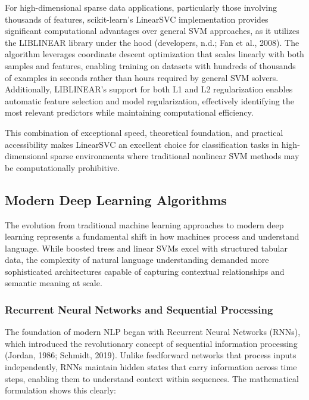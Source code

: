 \documentclass[
  titlepage]{article}
\begin{document}
For high-dimensional sparse data applications, particularly those
involving thousands of features, scikit-learn's LinearSVC implementation
provides significant computational advantages over general SVM
approaches, as it utilizes the LIBLINEAR library under the hood
(developers, n.d.; Fan et al., 2008). The algorithm leverages coordinate
descent optimization that scales linearly with both samples and
features, enabling training on datasets with hundreds of thousands of
examples in seconds rather than hours required by general SVM solvers.
Additionally, LIBLINEAR's support for both L1 and L2 regularization
enables automatic feature selection and model regularization,
effectively identifying the most relevant predictors while maintaining
computational efficiency.

This combination of exceptional speed, theoretical foundation, and
practical accessibility makes LinearSVC an excellent choice for
classification tasks in high-dimensional sparse environments where
traditional nonlinear SVM methods may be computationally prohibitive.

\subsection{Modern Deep Learning
Algorithms}\label{modern-deep-learning-algorithms}

The evolution from traditional machine learning approaches to modern
deep learning represents a fundamental shift in how machines process and
understand language. While boosted trees and linear SVMs excel with
structured tabular data, the complexity of natural language
understanding demanded more sophisticated architectures capable of
capturing contextual relationships and semantic meaning at scale.

\subsubsection{Recurrent Neural Networks and Sequential
Processing}\label{recurrent-neural-networks-and-sequential-processing}

The foundation of modern NLP began with Recurrent Neural Networks
(RNNs), which introduced the revolutionary concept of sequential
information processing (Jordan, 1986; Schmidt, 2019). Unlike feedforward
networks that process inputs independently, RNNs maintain hidden states
that carry information across time steps, enabling them to understand
context within sequences. The mathematical formulation shows this
clearly:
\end{document}
